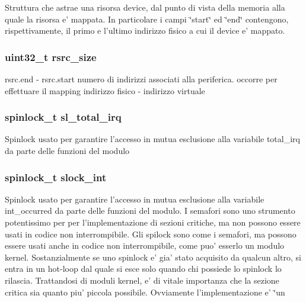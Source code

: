 Struttura che astrae una risorsa device, dal punto di vista della memoria alla quale la risorsa e' mappata. In particolare i campi \char`\"{}start\char`\"{} ed \char`\"{}end\char`\"{} contengono, rispettivamente, il primo e l'ultimo indirizzo fisico a cui il device e' mappato. \hypertarget{structmy_g_p_i_o_k__t_a0f87b53dc5049a349ef01aa586c0b5dc}{
\subsubsection[{rsrc\+\_\+size}]{\setlength{\rightskip}{0pt plus 5cm}uint32\+\_\+t rsrc\+\_\+size}}\label{structmy_g_p_i_o_k__t_a0f87b53dc5049a349ef01aa586c0b5dc}
rsrc.\+end -\/ rsrc.\+start numero di indirizzi associati alla periferica. occorre per effettuare il mapping indirizzo fisico -\/ indirizzo virtuale \hypertarget{structmy_g_p_i_o_k__t_ac41bbc7fe03ef25b7f468275fb565d78}{
\subsubsection[{sl\+\_\+total\+\_\+irq}]{\setlength{\rightskip}{0pt plus 5cm}spinlock\+\_\+t sl\+\_\+total\+\_\+irq}}\label{structmy_g_p_i_o_k__t_ac41bbc7fe03ef25b7f468275fb565d78}
Spinlock usato per garantire l'accesso in mutua esclusione alla variabile total\+\_\+irq da parte delle funzioni del modulo \hypertarget{structmy_g_p_i_o_k__t_a1e1ddf972b4dc84dd331a0c72e5d9895}{
\subsubsection[{slock\+\_\+int}]{\setlength{\rightskip}{0pt plus 5cm}spinlock\+\_\+t slock\+\_\+int}}\label{structmy_g_p_i_o_k__t_a1e1ddf972b4dc84dd331a0c72e5d9895}
Spinlock usato per garantire l'accesso in mutua esclusione alla variabile int\+\_\+occurred da parte delle funzioni del modulo. I semafori sono uno strumento potentissimo per per l'implementazione di sezioni critiche, ma non possono essere usati in codice non interrompibile. Gli spilock sono come i semafori, ma possono essere usati anche in codice non interrompibile, come puo' esserlo un modulo kernel. Sostanzialmente se uno spinlock e' gia' stato acquisito da qualcun altro, si entra in un hot-\/loop dal quale si esce solo quando chi possiede lo spinlock lo rilascia. Trattandosi di moduli kernel, e' di vitale importanza che la sezione critica sia quanto piu' piccola possibile. Ovviamente l'implementazione e' \char`\"{}un
